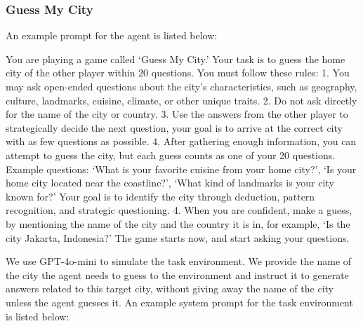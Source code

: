 \documentclass{article}
\theoremstyle{plain}
\theoremstyle{definition}
\theoremstyle{remark}
\begin{document}
\subsubsection{Guess My City}
An example prompt for the agent is listed below:
\begin{tcolorbox}[colback=gray!20, colframe=black, title=Guess My City Agent Prompt]
You are playing a game called `Guess My City.' Your task is to guess the home city of the other player within 20 questions.
You must follow these rules:
1. You may ask open-ended questions about the city's characteristics, such as geography, culture, landmarks, cuisine, climate, or other unique traits.
2. Do not ask directly for the name of the city or country.
3. Use the answers from the other player to strategically decide the next question, your goal is to arrive at the correct city with as few questions as possible.
4. After gathering enough information, you can attempt to guess the city, but each guess counts as one of your 20 questions.
Example questions: `What is your favorite cuisine from your home city?', `Is your home city located near the coastline?', `What kind of landmarks is your city known for?' Your goal is to identify the city through deduction, pattern recognition, and strategic questioning.
4. When you are confident, make a guess, by mentioning the name of the city and the country it is in, for example, `Is the city Jakarta, Indonesia?'
The game starts now, and start asking your questions.
\end{tcolorbox}
We use GPT-4o-mini to simulate the task environment. We provide the name of the city the agent needs to guess to the environment and instruct it to generate answers related to this target city, without giving away the name of the city unless the agent guesses it. An example system prompt for the task environment is listed below:
\end{document}
